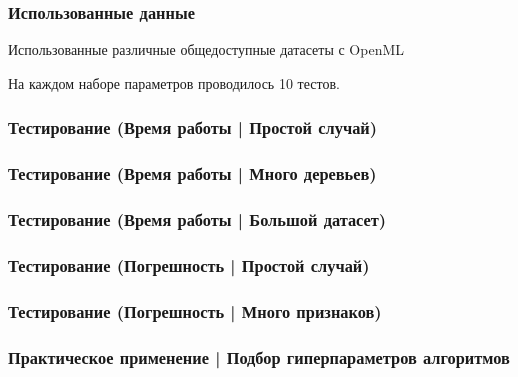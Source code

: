 \documentclass{beamer}
\begin{document}
\begin{frame} \frametitle{Использованные данные}
    Использованные различные общедоступные датасеты с OpenML

    \vfill
    \begin{center}
        
        \vfill
        На каждом наборе параметров проводилось 10 тестов.
    \end{center}
\end{frame}

\begin{frame} \frametitle{Тестирование (Время работы | Простой случай)}
    \begin{center}
    \end{center}
\end{frame}

\begin{frame} \frametitle{Тестирование (Время работы | Много деревьев)}
    \begin{center}
    \end{center}
\end{frame}

\begin{frame} \frametitle{Тестирование (Время работы | Большой датасет)}
    \begin{center}
    \end{center}
\end{frame}

\begin{frame} \frametitle{Тестирование (Погрешность | Простой случай)}
    \begin{center}
    \end{center}
\end{frame}

\begin{frame} \frametitle{Тестирование (Погрешность | Много признаков)}
    \begin{center}
    \end{center}
\end{frame}

\begin{frame} \frametitle{Практическое применение | Подбор гиперпараметров алгоритмов}
\end{frame}
\end{document}
